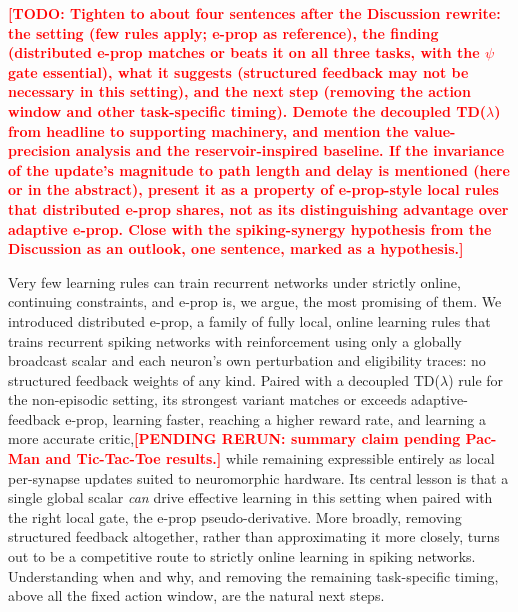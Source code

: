 \documentclass[10pt,twocolumn]{article}
\newcommand{\pending}[1]{\textcolor{red}{\bfseries[PENDING RERUN#1]}}
\newcommand{\todo}[1]{\textcolor{red}{\bfseries[TODO: #1]}}
\begin{document}
\todo{Tighten to about four sentences after the Discussion rewrite: the
setting (few rules apply; e-prop as reference), the finding (distributed
e-prop matches or beats it on all three tasks, with the $\psi$ gate
essential), what it suggests (structured feedback may not be necessary in
this setting), and the next step (removing the action window and other
task-specific timing). Demote the decoupled TD($\lambda$) from headline to
supporting machinery, and mention the value-precision analysis and the
reservoir-inspired baseline. If the invariance of the update's magnitude to
path length and delay is mentioned (here or in the abstract), present it as a
property of e-prop-style local rules that distributed e-prop shares, not as
its distinguishing advantage over adaptive e-prop. Close with the spiking-synergy hypothesis from
the Discussion as an outlook, one sentence, marked as a hypothesis.}

Very few learning rules can train recurrent networks under strictly online,
continuing constraints, and e-prop is, we argue, the most promising of them.
We introduced distributed e-prop, a family of fully local, online learning
rules that trains recurrent spiking networks with reinforcement using only a
globally broadcast scalar and each neuron's own perturbation and eligibility
traces: no structured feedback weights of any kind. Paired with a decoupled
TD($\lambda$) rule for the non-episodic setting, its strongest variant matches
or exceeds adaptive-feedback e-prop, learning faster, reaching a higher reward
rate, and learning a more accurate critic,\pending{: summary claim pending
Pac-Man and Tic-Tac-Toe results.} while remaining expressible entirely as local
per-synapse updates suited to neuromorphic hardware. Its central lesson is that
a single global scalar \emph{can} drive effective learning in this setting when
paired with the right local gate, the e-prop pseudo-derivative. More broadly,
removing structured feedback altogether, rather than approximating it more
closely, turns out to be a competitive route to strictly online learning in
spiking networks. Understanding when and why, and removing the remaining
task-specific timing, above all the fixed action window, are the natural next
steps.




\clearpage
\onecolumn
\appendix
\end{document}
